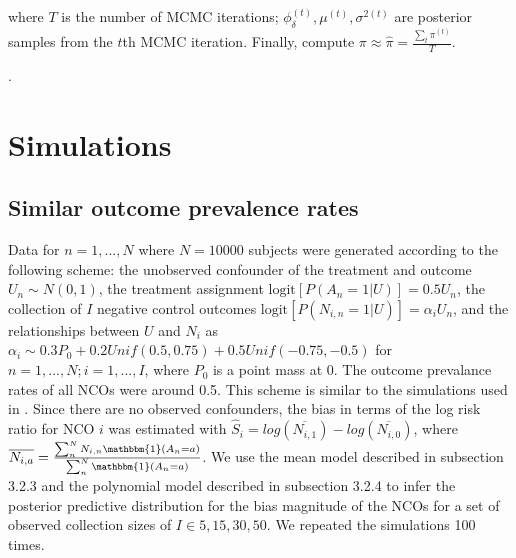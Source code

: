 where $T$ is the number of MCMC iterations; $\phi_\delta^{(t)}, \mu^{(t)}, \sigma^{2(t)}$ are posterior samples from the $t$th MCMC iteration. Finally, compute $\pi \approx \hat{\pi} = \frac{\sum_t \pi^{(t)}}{T}$.

.

\section{Simulations}
\label{sec:nco_sim}

\subsection{Similar outcome prevalence rates}

Data for $n=1,...,N$ where $N=10000$ subjects were generated according to the following scheme: the unobserved confounder of the treatment and outcome $U_n \sim N(0, 1)$, the treatment assignment $\text{logit}[P(A_n=1|U)] = 0.5 U_n$, the collection of $I$ negative control outcomes $\text{logit}[P(N_{i,n}=1|U)] = \alpha_{i} U_n$, and the relationships between $U$ and $N_i$ as $\alpha_{i} \sim 0.3P_0 + 0.2 Unif(0.5, 0.75) + 0.5 Unif(-0.75, -0.5)$ for $n=1,...,N; i=1,...,I$, where $P_0$ is a point mass at 0.
The outcome prevalance rates of all NCOs were around 0.5.
This scheme is similar to the simulations used in \citep{gruber2016limitations}.
Since there are no observed confounders, the bias in terms of the log risk ratio for NCO $i$ was estimated with $\widehat{S}_{i} = log(\overline{N_{i,1}}) - log(\overline{N_{i,0}})$, where $\overline{N_{i,a}} = \frac{\sum_n^{N} N_{i,n} \mathbbm{1}(A_n=a)}{\sum_n^{N} \mathbbm{1}(A_n=a)}$.
We use the mean model described in subsection 3.2.3 and the polynomial model described in subsection 3.2.4 to infer the posterior predictive distribution for the bias magnitude of the NCOs for a set of observed collection sizes of $I \in {5, 15, 30, 50}$.
We repeated the simulations 100 times.

